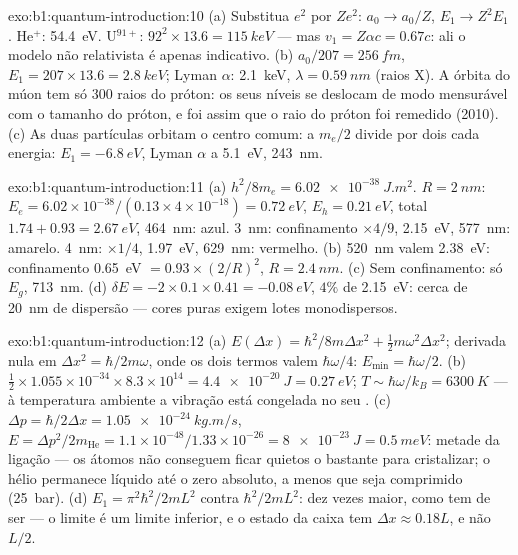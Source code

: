 \begin{solution}{exo:b1:quantum-introduction:10}
(a) Substitua $e^2$ por $Ze^2$: $a_0 \to a_0/Z$, $E_1 \to Z^2E_1$. He$^+$:
\qty{54.4}{eV}. U$^{91+}$: $92^2 \times 13.6 = \qty{115}{keV}$ --- mas $v_1 = Z\alpha c
= 0.67c$: ali o modelo não relativista é apenas indicativo. (b) $a_0/207
= \qty{256}{fm}$, $E_1 = 207 \times 13.6 = \qty{2.8}{keV}$; Lyman $\alpha$:
\qty{2.1}{keV}, $\lambda = \qty{0.59}{nm}$ (raios X). A órbita do múon tem só
$300$ raios do próton: os seus níveis se deslocam de modo mensurável com o tamanho do próton,
e foi assim que o raio do próton foi remedido (2010). (c) As duas
partículas orbitam o centro comum: a  $m_e/2$ divide por dois
cada energia: $E_1 = \qty{-6.8}{eV}$, Lyman $\alpha$ a \qty{5.1}{eV}, \qty{243}{nm}.
\end{solution}

\begin{solution}{exo:b1:quantum-introduction:11}
(a) $h^2/8m_e = \qty{6.02e-38}{J.m^2}$. $R = \qty{2}{nm}$: $E_e = 6.02 \times 10^{-38}/
(0.13 \times 4 \times 10^{-18}) = \qty{0.72}{eV}$, $E_h = \qty{0.21}{eV}$, total $1.74 +
0.93 = \qty{2.67}{eV}$, \qty{464}{nm}: azul. \qty{3}{nm}: confinamento $\times4/9$,
\qty{2.15}{eV}, \qty{577}{nm}: amarelo. \qty{4}{nm}: $\times1/4$, \qty{1.97}{eV},
\qty{629}{nm}: vermelho. (b) \qty{520}{nm} valem \qty{2.38}{eV}: confinamento \qty{0.65}{eV}
$= 0.93 \times (2/R)^2$, $R = \qty{2.4}{nm}$. (c) Sem confinamento: só $E_g$,
\qty{713}{nm}. (d) $\delta E = -2 \times 0.1 \times 0.41 = \qty{-0.08}{eV}$, $4\%$ de
\qty{2.15}{eV}: cerca de \qty{20}{nm} de dispersão --- cores puras exigem
lotes monodispersos.
\end{solution}

\begin{solution}{exo:b1:quantum-introduction:12}
(a) $E(\Delta x) = \hbar^2/8m\Delta x^2 + \tfrac12m\omega^2\Delta x^2$; derivada nula em
$\Delta x^2 = \hbar/2m\omega$, onde os dois termos valem $\hbar\omega/4$: $E_{\min} =
\hbar\omega/2$. (b) $\tfrac12 \times 1.055 \times 10^{-34} \times 8.3 \times 10^{14} = \qty{4.4e-20}{J}
= \qty{0.27}{eV}$; $T \sim \hbar\omega/k_B = \qty{6300}{K}$ --- à temperatura ambiente
a vibração está congelada no seu . (c) $\Delta p = \hbar/2\Delta x =
\qty{1.05e-24}{kg.m/s}$, $E = \Delta p^2/2m_{\mathrm{He}} = 1.1 \times 10^{-48}/1.33 \times
10^{-26} = \qty{8e-23}{J} = \qty{0.5}{meV}$: metade da ligação --- os átomos não conseguem
ficar quietos o bastante para cristalizar; o hélio permanece líquido até o zero
absoluto, a menos que seja comprimido (\qty{25}{bar}). (d) $E_1 = \pi^2\hbar^2/2mL^2$ contra
$\hbar^2/2mL^2$: dez vezes maior, como tem de ser --- o limite é um limite
inferior, e o estado da caixa tem $\Delta x \approx 0.18L$, e não $L/2$.
\end{solution}

